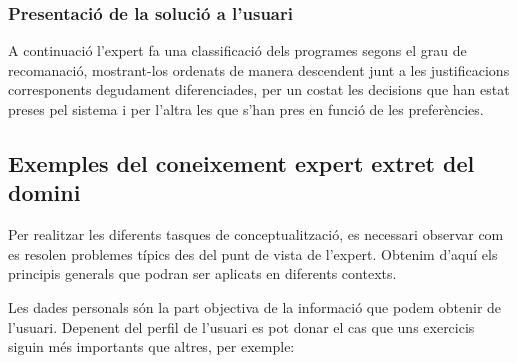\documentclass[a4paper, 12pt, UTF8]{article}
\begin{document}
\subsubsection*{Presentació de la solució a l'usuari}

A continuació l'expert fa una classificació dels programes segons el grau de recomanació, mostrant-los ordenats de manera descendent junt a les justificacions corresponents degudament diferenciades, per un costat les decisions que han estat preses pel sistema i per l'altra les que s'han pres en funció de les preferències.

\subsection{Exemples del coneixement expert extret del domini} 

Per realitzar les diferents tasques de conceptualització, es necessari observar com es resolen problemes típics des del punt de vista de l'expert. Obtenim d'aquí els principis generals que podran ser aplicats en diferents contexts.

Les dades personals són la part objectiva de la informació que podem obtenir de l'usuari. Depenent del perfil de l'usuari es pot donar el cas que uns exercicis siguin més importants que altres, per exemple:
\end{document}
